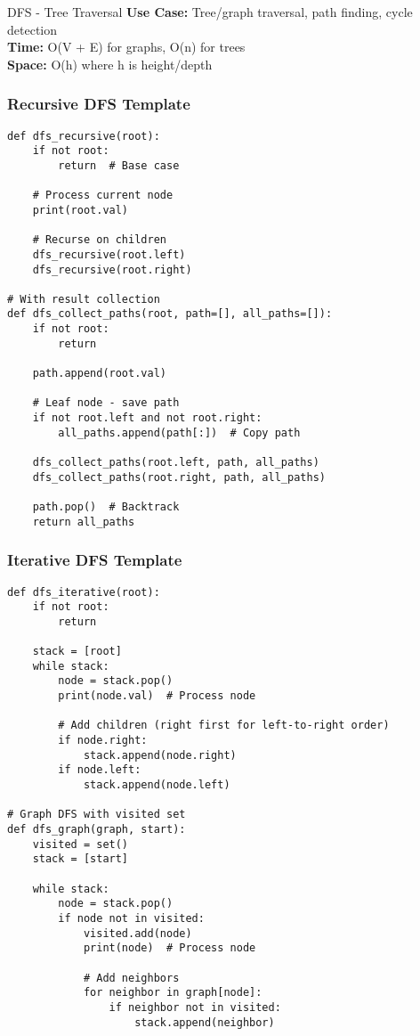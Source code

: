 \documentclass[10pt,a4paper]{article}
\begin{document}
\begin{patternbox}{DFS - Tree Traversal}
\textbf{Use Case:} Tree/graph traversal, path finding, cycle detection\\
\textbf{Time:} O(V + E) for graphs, O(n) for trees\\
\textbf{Space:} O(h) where h is height/depth
\end{patternbox}

\subsubsection{Recursive DFS Template}
\begin{lstlisting}
def dfs_recursive(root):
    if not root:
        return  # Base case

    # Process current node
    print(root.val)

    # Recurse on children
    dfs_recursive(root.left)
    dfs_recursive(root.right)

# With result collection
def dfs_collect_paths(root, path=[], all_paths=[]):
    if not root:
        return

    path.append(root.val)

    # Leaf node - save path
    if not root.left and not root.right:
        all_paths.append(path[:])  # Copy path

    dfs_collect_paths(root.left, path, all_paths)
    dfs_collect_paths(root.right, path, all_paths)

    path.pop()  # Backtrack
    return all_paths
\end{lstlisting}

\subsubsection{Iterative DFS Template}
\begin{lstlisting}
def dfs_iterative(root):
    if not root:
        return

    stack = [root]
    while stack:
        node = stack.pop()
        print(node.val)  # Process node

        # Add children (right first for left-to-right order)
        if node.right:
            stack.append(node.right)
        if node.left:
            stack.append(node.left)

# Graph DFS with visited set
def dfs_graph(graph, start):
    visited = set()
    stack = [start]

    while stack:
        node = stack.pop()
        if node not in visited:
            visited.add(node)
            print(node)  # Process node

            # Add neighbors
            for neighbor in graph[node]:
                if neighbor not in visited:
                    stack.append(neighbor)
\end{lstlisting}
\end{document}
